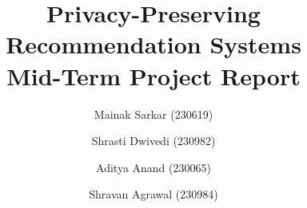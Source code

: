 \documentclass[11pt]{article}


\geometry{margin=0.85in}
\setlength{\parskip}{0.3em}



\title{\bfseries Privacy-Preserving Recommendation Systems\\[0.3em]
       \large Mid-Term Project Report}

\author{Mainak Sarkar (230619) \and Shrasti Dwivedi (230982) \and
        Aditya Anand (230065) \and Shravan Agrawal (230984)}

